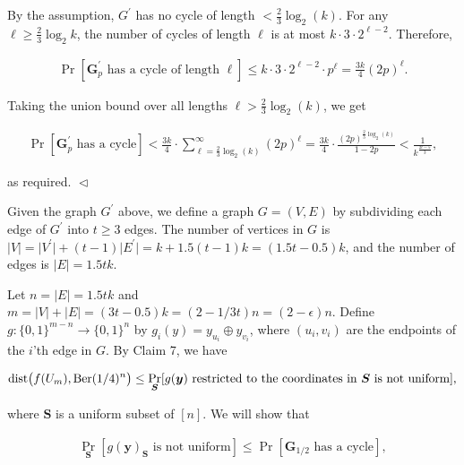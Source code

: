 \documentclass[10pt,a4paper]{article}
\begin{document}
By the assumption, $G^{\prime}$ has no cycle of length $<\frac{2}{3}\log_{2}(k)$. For any $\ell\geq\frac{2}{3}\log_{2}k$, the number of cycles of length $\ell$ is at most $k\cdot 3\cdot 2^{\ell-2}$.
Therefore,\par


\[\begin{gathered}
\Pr[\text{$\boldsymbol{G}^{\prime}_{p}$ has a cycle of length $\ell$}]\leq k\cdot 3\cdot 2^{\ell-2}\cdot p^{\ell}=\frac{3k}{4}(2p)^{\ell}.
\end{gathered}\]


Taking the union bound over all lengths $\ell>\frac{2}{3}\log_{2}(k)$, we get\par


\[\begin{gathered}
\Pr[\text{$\boldsymbol{G}^{\prime}_{p}$ has a cycle}]<\frac{3k}{4}\cdot\sum_{\ell=\frac{2}{3}\log_{2}(k)}^{\infty}(2p)^{\ell}=\frac{3k}{4}\cdot\frac{(2p)^{\frac{2}{3}\log_{2}(k)}}{1-2p}<\frac{1}{k^{\frac{2t-5}{3}}},
\end{gathered}\]


as required.
$\vartriangleleft$\par




Given the graph $G^{\prime}$ above, we define a graph $G=(V,E)$ by subdividing each edge of $G^{\prime}$ into $t\geq 3$ edges.
The number of vertices in $G$ is $\lvert V\rvert=\lvert V^{\prime}\rvert+(t-1)\lvert E^{\prime}\rvert=k+1.5(t-1)k=(1.5t-0.5)k$, and the number of edges is $\lvert E\rvert=1.5tk$.\par




Let $n=\lvert E\rvert=1.5tk$ and $m=\lvert V\rvert+\lvert E\rvert=(3t-0.5)k=(2-1/3t)n=(2-\epsilon)n$.
Define $g\colon\{0,1\}^{m-n}\to\{0,1\}^{n}$ by $g_{i}(y)=y_{u_{i}}\oplus y_{v_{i}}$, where $(u_{i},v_{i})$ are the endpoints of the $i$’th edge in $G$.
By Claim 7, we have\par


\[\begin{gathered}
\mathrm{dist}\bigl(f(U_{m}),\textnormal{Ber}(1/4)^{n}\bigr)\leq\Pr_{\boldsymbol{S}}[\text{$g(\boldsymbol{y})$ restricted to the coordinates in $\boldsymbol{S}$ is not uniform}],
\end{gathered}\]


where $\boldsymbol{S}$ is a uniform subset of $[n]$.
We will show that\par


\[\begin{gathered}
\displaystyle\Pr_{\boldsymbol{S}}[\text{$g(\boldsymbol{y})_{\boldsymbol{S}}$ is not uniform}]\leq\Pr[\text{$\boldsymbol{G}_{1/2}$ has a cycle}],
\end{gathered}\]
\end{document}
